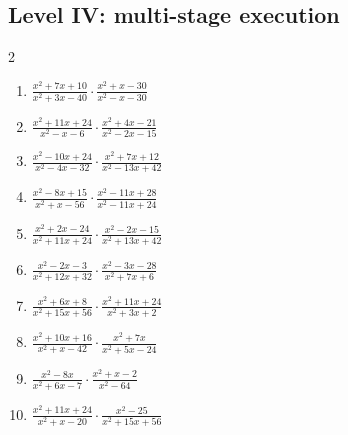 \documentclass[11pt,oneside]{book}
\begin{document}
\subsection*{Level IV: multi-stage execution}
\begin{multicols}{2}
\begin{enumerate}[leftmargin=*,label=\textbf{\arabic*.},itemsep=0.65\baselineskip]
\item $\displaystyle \frac{x^{2} + 7 x + 10}{x^{2} + 3 x - 40}\cdot\frac{x^{2} + x - 30}{x^{2} - x - 30}$
\item $\displaystyle \frac{x^{2} + 11 x + 24}{x^{2} - x - 6}\cdot\frac{x^{2} + 4 x - 21}{x^{2} - 2 x - 15}$
\item $\displaystyle \frac{x^{2} - 10 x + 24}{x^{2} - 4 x - 32}\cdot\frac{x^{2} + 7 x + 12}{x^{2} - 13 x + 42}$
\item $\displaystyle \frac{x^{2} - 8 x + 15}{x^{2} + x - 56}\cdot\frac{x^{2} - 11 x + 28}{x^{2} - 11 x + 24}$
\item $\displaystyle \frac{x^{2} + 2 x - 24}{x^{2} + 11 x + 24}\cdot\frac{x^{2} - 2 x - 15}{x^{2} + 13 x + 42}$
\item $\displaystyle \frac{x^{2} - 2 x - 3}{x^{2} + 12 x + 32}\cdot\frac{x^{2} - 3 x - 28}{x^{2} + 7 x + 6}$
\item $\displaystyle \frac{x^{2} + 6 x + 8}{x^{2} + 15 x + 56}\cdot\frac{x^{2} + 11 x + 24}{x^{2} + 3 x + 2}$
\item $\displaystyle \frac{x^{2} + 10 x + 16}{x^{2} + x - 42}\cdot\frac{x^{2} + 7 x}{x^{2} + 5 x - 24}$
\item $\displaystyle \frac{x^{2} - 8 x}{x^{2} + 6 x - 7}\cdot\frac{x^{2} + x - 2}{x^{2} - 64}$
\item $\displaystyle \frac{x^{2} + 11 x + 24}{x^{2} + x - 20}\cdot\frac{x^{2} - 25}{x^{2} + 15 x + 56}$
\end{enumerate}
\end{multicols}
\end{document}

